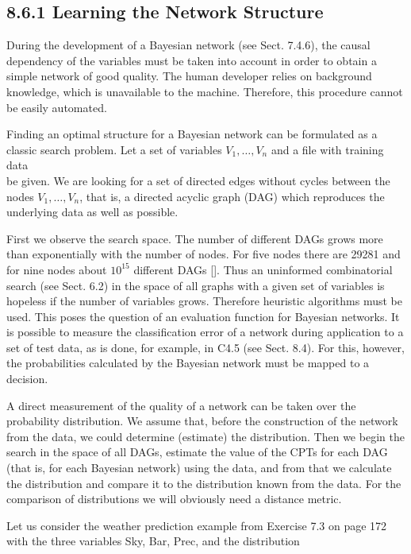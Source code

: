 \documentclass[10pt]{article}
\begin{document}
\subsection*{8.6.1 Learning the Network Structure}
During the development of a Bayesian network (see Sect. 7.4.6), the causal dependency of the variables must be taken into account in order to obtain a simple network of good quality. The human developer relies on background knowledge, which is unavailable to the machine. Therefore, this procedure cannot be easily automated.

Finding an optimal structure for a Bayesian network can be formulated as a classic search problem. Let a set of variables $V_{1}, \ldots, V_{n}$ and a file with training data\\
be given. We are looking for a set of directed edges without cycles between the nodes $V_{1}, \ldots, V_{n}$, that is, a directed acyclic graph (DAG) which reproduces the underlying data as well as possible.

First we observe the search space. The number of different DAGs grows more than exponentially with the number of nodes. For five nodes there are 29281 and for nine nodes about $10^{15}$ different DAGs [\cite{melancon2000random}]. Thus an uninformed combinatorial search (see Sect. 6.2) in the space of all graphs with a given set of variables is hopeless if the number of variables grows. Therefore heuristic algorithms must be used. This poses the question of an evaluation function for Bayesian networks. It is possible to measure the classification error of a network during application to a set of test data, as is done, for example, in C4.5 (see Sect. 8.4). For this, however, the probabilities calculated by the Bayesian network must be mapped to a decision.

A direct measurement of the quality of a network can be taken over the probability distribution. We assume that, before the construction of the network from the data, we could determine (estimate) the distribution. Then we begin the search in the space of all DAGs, estimate the value of the CPTs for each DAG (that is, for each Bayesian network) using the data, and from that we calculate the distribution and compare it to the distribution known from the data. For the comparison of distributions we will obviously need a distance metric.

Let us consider the weather prediction example from Exercise 7.3 on page 172 with the three variables Sky, Bar, Prec, and the distribution
\end{document}
